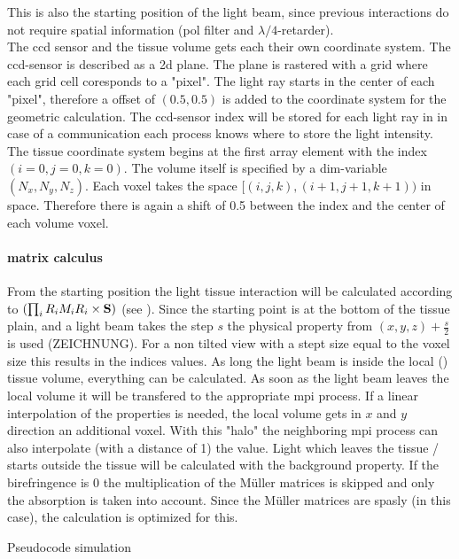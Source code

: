 This is also the starting position of the light beam, since previous interactions do not require spatial information (\ie pol filter and $\lambda/4$-retarder).\\
% 
The ccd sensor and the tissue volume gets each their own coordinate system.
The ccd-sensor is described as a 2d plane.
The plane is rastered with a grid where each grid cell coresponds to a "pixel".
The light ray starts in the center of each "pixel", therefore a offset of $(\num{0.5}, \num{0.5})$ is added to the coordinate system for the geometric calculation.
The ccd-sensor index will be stored for each light ray in in case of a \mpi communication each process knows where to store the light intensity.\\
% 
The tissue coordinate system begins at the first array element with the index $(i=0, j=0, k=0)$.
The volume itself is specified by a dim-variable $(N_x, N_y, N_z)$.
Each voxel takes the space $[(i,j,k),(i+1,j+1,k+1))$ in space.
Therefore there is again a shift of \num{0.5} between the index and the center of each volume voxel.

% 
\paragraph{matrix calculus}
From the starting position the light tissue interaction will be calculated according to $\left( \prod_i R_i M_i R_i \times \mathbf{S} \right)$ (see \dummy).
Since the starting point is at the bottom of the tissue plain, and a light beam takes the step $s$ the physical property from $(x,y,z) + \frac{s}{2}$ is used (ZEICHNUNG).
For a non tilted view with a stept size equal to the voxel size this results in the indices values.
As long the light beam is inside the local (\mpi) tissue volume, everything can be calculated.
As soon as the light beam leaves the local volume it will be transfered to the appropriate mpi process.
If a linear interpolation of the properties is needed, the local volume gets in $x$ and $y$ direction an additional voxel.
With this "halo" the neighboring mpi process can also interpolate (with a distance of 1) the value.
Light which leaves the tissue / starts outside the tissue will be calculated with the background property.
% 
If the birefringence is 0 the multiplication of the M\"uller matrices is skipped and only the absorption is taken into account.
Since the M\"uller matrices are spasly (in this case), the calculation is optimized for this.
% 
\begin{lstfloat}[!t]
	
	\caption{Pseudocode simulation}
	\label{alg:simulation}
\end{lstfloat}
%
% 
